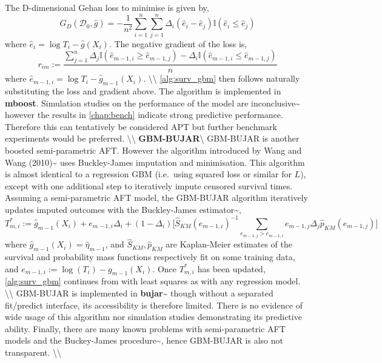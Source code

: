 \documentclass[
  letterpaper,
]{scrbook}
\theoremstyle{plain}
\theoremstyle{definition}
\theoremstyle{remark}
\begin{document}
The D-dimensional Gehan loss to minimise is given by, \[
G_D(\mathcal{D}_0, \hat{g}) = -\frac{1}{n^2} \sum^n_{i=1}\sum^n_{j=1} \Delta_i (\hat{e}_i - \hat{e}_j)\mathbb{I}(\hat{e}_i \leq \hat{e}_j)
\] where \(\hat{e}_i = \log T_i - \hat{g}(X_i)\). The negative gradient
of the loss is, \[
r_{im} := \frac{\sum^n_{j=1} \Delta_j \mathbb{I}(\hat{e}_{m-1,i} \geq \hat{e}_{m-1,j}) -\Delta_i\mathbb{I}(\hat{e}_{m-1,i} \leq \hat{e}_{m-1,j})}{n}
\] where \(\hat{e}_{m-1,i} = \log T_i - \hat{g}_{m-1}(X_i)\).
\textbackslash\textbackslash{} \ref{alg:surv_gbm} then follows naturally
substituting the loss and gradient above. The algorithm is implemented
in \textbf{mboost}. Simulation studies on the performance of the model
are inconclusive\textasciitilde{}\cite{Johnson2011} however the results
in \ref{chap:bench} indicate strong predictive performance. Therefore
this can tentatively be considered APT but further benchmark experiments
would be preferred. \textbackslash\textbackslash{}
\textbf{GBM-BUJAR}\label{mod:gbmbujar}\textbackslash{} GBM-BUJAR is
another boosted semi-parametric AFT. However the algorithm introduced by
Wang and Wang (2010)\textasciitilde{}\cite{Wang2010} uses Buckley-James
imputation and minimisation. This algorithm is almost identical to a
regression GBM (i.e.~using squared loss or similar for \(L\)), except
with one additional step to iteratively impute censored survival times.
Assuming a semi-parametric AFT model, the GBM-BUJAR algorithm
iteratively updates imputed outcomes with the Buckley-James
estimator\textasciitilde{}\cite{Buckley1979}, \[
T^*_{m, i} := \hat{g}_{m-1}(X_i) + e_{m-1, i}\Delta_i + (1-\Delta_i)\Big[\hat{S}_{KM}(e_{m-1, i})^{-1}\sum_{e_{m-1, j} > e_{m-1, i}} e_{m-1, j}\Delta_j \hat{p}_{KM}(e_{m-1, j})\Big]
\] where \(\hat{g}_{m-1}(X_i) = \hat{\eta}_{m-1}\), and
\(\hat{S}_{KM}, \hat{p}_{KM}\) are Kaplan-Meier estimates of the
survival and probability mass functions respectively fit on some
training data, and \(e_{m-1,i} := \log(T_i) - g_{m-1}(X_i)\). Once
\(T^*_{m, i}\) has been updated, \ref{alg:surv_gbm} continues from with
least squares as with any regression model.
\textbackslash\textbackslash{} GBM-BUJAR is implemented in
\textbf{bujar}\textasciitilde{}\cite{pkgbujar} though without a
separated fit/predict interface, its accessibility is therefore limited.
There is no evidence of wide usage of this algorithm nor simulation
studies demonstrating its predictive ability. Finally, there are many
known problems with semi-parametric AFT models and the Buckey-James
procedure\textasciitilde{}\cite{Wei1992}, hence GBM-BUJAR is also not
transparent. \textbackslash\textbackslash{}
\end{document}
